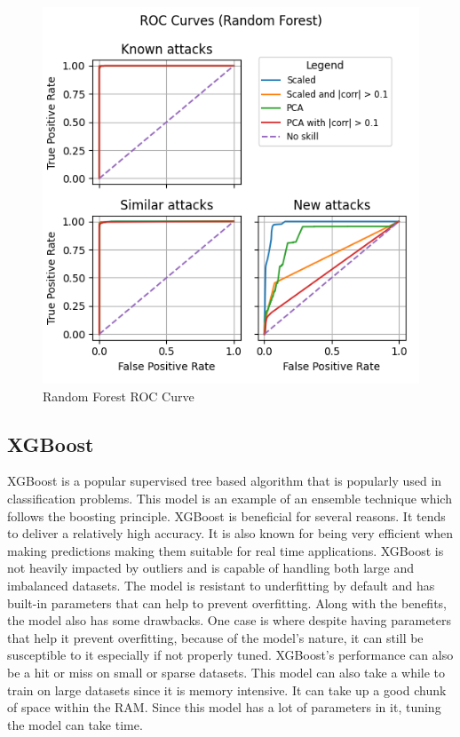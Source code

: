 \documentclass[journal]{IEEEtran}
\begin{document}
\begin{figure}
    \centering
    \includegraphics[width=\linewidth]{figures/Random Forest_roc_all_small.png}
    \caption{Random Forest ROC Curve}
    \label{fig:randomforest_roc}
\end{figure}

\subsection{XGBoost}
XGBoost is a popular supervised tree based algorithm that is popularly used in classification problems. This model is an example of an ensemble technique which follows the boosting principle. XGBoost is beneficial for several reasons. It tends to deliver a relatively high accuracy. It is also known for being very efficient when making predictions making them suitable for real time applications. XGBoost is not heavily impacted by outliers and is capable of handling both large and imbalanced datasets. The model is resistant to underfitting by default and has built-in parameters that can help to prevent overfitting. Along with the benefits, the model also has some drawbacks. One case is where despite having parameters that help it prevent overfitting, because of the model's nature, it can still be susceptible to it especially if not properly tuned. XGBoost's performance can also be a hit or miss on small or sparse datasets. This model can also take a while to train on large datasets since it is memory intensive. It can take up a good chunk of space within the RAM. Since this model has a lot of parameters in it, tuning the model can take time.  
\end{document}
